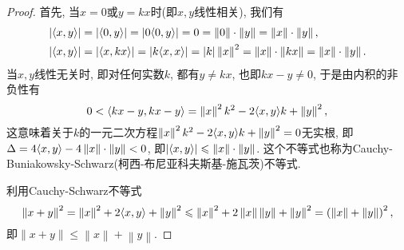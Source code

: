 \begin{quizb}
\begin{proof}
首先, 当\(x=0\)或\(y=kx\)时(即\(x,y\)线性相关), 我们有\[\begin{split}
\left|\langle x,y \rangle\right|&=\left|\langle 0,y \rangle\right|=\left|0\langle 0,y \rangle\right|=0=\left\|0\right\|\cdot\left\|y\right\|=\left\|x\right\|\cdot\left\|y\right\|,\\
\left|\langle x,y \rangle\right|&=\left|\langle x,kx \rangle\right|=\left|k\langle x,x \rangle\right|=|k|\left\|x\right\|^2=\left\|x\right\|\cdot\left\|kx\right\|=\left\|x\right\|\cdot\left\|y\right\|.
\end{split}\]当\(x,y\)线性无关时, 即对任何实数\(k\), 都有\(y\ne kx\), 也即\(kx-y\ne 0\), 于是由内积的非负性有\[0<\langle kx-y,kx-y \rangle=\left\|x\right\|^2k^2-2\langle x,y \rangle k+\left\|y\right\|^2,\]这意味着关于\(k\)的一元二次方程\(\left\|x\right\|^2k^2-2\langle x,y \rangle k+\left\|y\right\|^2=0\)无实根, 即\(\Delta=4\langle x,y \rangle-4\left\|x\right\|\cdot\left\|y\right\|<0\), 即\(\left|\langle x,y \rangle\right|\leqslant\left\|x\right\|\cdot\left\|y\right\|\). 这个不等式也称为Cauchy-Buniakowsky-Schwarz(柯西-布尼亚科夫斯基-施瓦茨)不等式.

利用Cauchy-Schwarz不等式\[\left\|x+y\right\|^2=\left\|x\right\|^2+2\langle x,y \rangle+\left\|y\right\|^2\leqslant\left\|x\right\|^2+2\left\|x\right\|\left\|y\right\|+\left\|y\right\|^2=\left(\left\|x\right\|+\left\|y\right\|\right)^2,\]即\(\left\|x+y\right\|\leqslant\left\|x\right\|+\left\|y\right\|\).


\end{proof}
\end{quizb}
